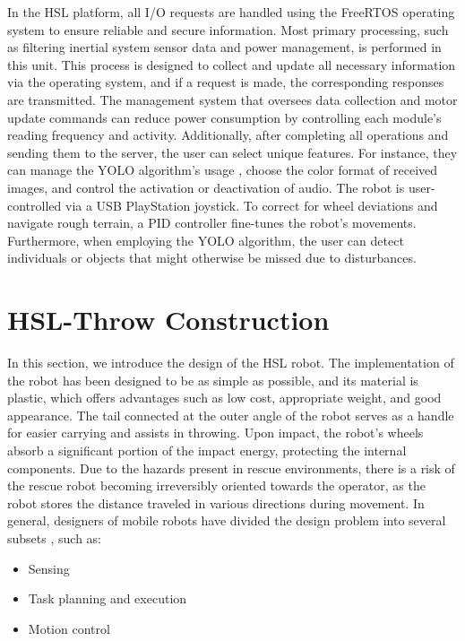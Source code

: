 \documentclass[conference]{IEEEtran}
\begin{document}
In the HSL platform, all I/O requests are handled using the FreeRTOS operating system to ensure reliable and secure information. Most primary processing, such as filtering inertial system sensor data and power management, is performed in this unit. This process is designed to collect and update all necessary information via the operating system, and if a request is made, the corresponding responses are transmitted. The management system that oversees data collection and motor update commands can reduce power consumption by controlling each module's reading frequency and activity. Additionally, after completing all operations and sending them to the server, the user can select unique features. For instance, they can manage the YOLO algorithm's usage \cite{Han2021}, choose the color format of received images, and control the activation or deactivation of audio. The robot is user-controlled via a USB PlayStation joystick. To correct for wheel deviations and navigate rough terrain, a PID controller fine-tunes the robot's movements. Furthermore, when employing the YOLO algorithm, the user can detect individuals or objects that might otherwise be missed due to disturbances.

\section{HSL-Throw Construction}
In this section, we introduce the design of the HSL robot. The implementation of the robot has been designed to be as simple as possible, and its material is plastic, which offers advantages such as low cost, appropriate weight, and good appearance. The tail connected at the outer angle of the robot serves as a handle for easier carrying and assists in throwing. Upon impact, the robot's wheels absorb a significant portion of the impact energy, protecting the internal components. Due to the hazards present in rescue environments, there is a risk of the rescue robot becoming irreversibly oriented towards the operator, as the robot stores the distance traveled in various directions during movement. In general, designers of mobile robots have divided the design problem into several subsets \cite{braunl2006embedded}, such as:
\begin{itemize}
    \item Sensing
    \item Task planning and execution
    \item Motion control
\end{itemize}
\end{document}
